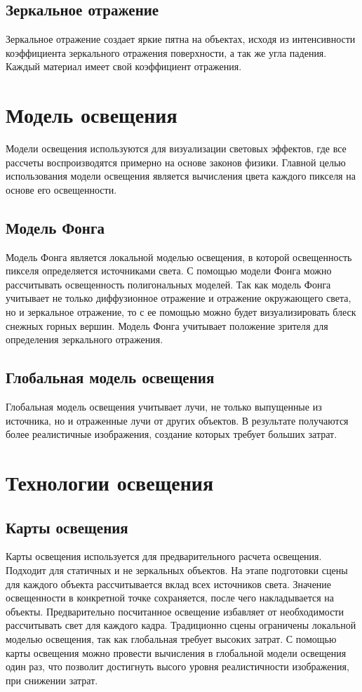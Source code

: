 \subsection{Зеркальное отражение}
Зеркальное отражение создает яркие пятна на объектах, исходя из интенсивности коэффициента зеркального отражения поверхности, а так же угла падения.
Каждый материал имеет свой коэффициент отражения.

\section{Модель освещения}
Модели освещения используются для визуализации световых эффектов, где все рассчеты воспроизводятся примерно на основе законов физики. Главной целью использования модели освещения является вычисления цвета каждого пикселя на основе его освещенности.

\subsection{Модель Фонга}
Модель Фонга является локальной моделью освещения, в которой освещенность пикселя определяется источниками света.
С помощью модели Фонга можно рассчитывать освещенность полигональных моделей.
Так как модель Фонга учитывает не только диффузионное отражение и отражение окружающего света, но и зеркальное отражение, то с ее помощью можно будет визуализировать блеск снежных горных вершин.
Модель Фонга учитывает положение зрителя для определения зеркального отражения.

\subsection{Глобальная модель освещения}
Глобальная модель освещения учитывает лучи, не только выпущенные из источника, но и отраженные лучи от других объектов. В результате получаются более реалистичные изображения, создание которых требует больших затрат.

\section{Технологии освещения}
\subsection{Карты освещения}
Карты освещения используется для предварительного расчета освещения. Подходит для статичных и не зеркальных объектов. На этапе подготовки сцены для каждого объекта рассчитывается вклад всех источников света. Значение освещенности в конкретной точке сохраняется, после чего накладывается на объекты. Предварительно посчитанное освещение избавляет от необходимости рассчитывать свет для каждого кадра.
Традиционно сцены ограничены локальной моделью освещения, так как глобальная требует высоких затрат. С помощью карты освещения можно провести вычисления в глобальной модели освещения один раз, что позволит достигнуть высого уровня реалистичности изображения, при снижении затрат.


